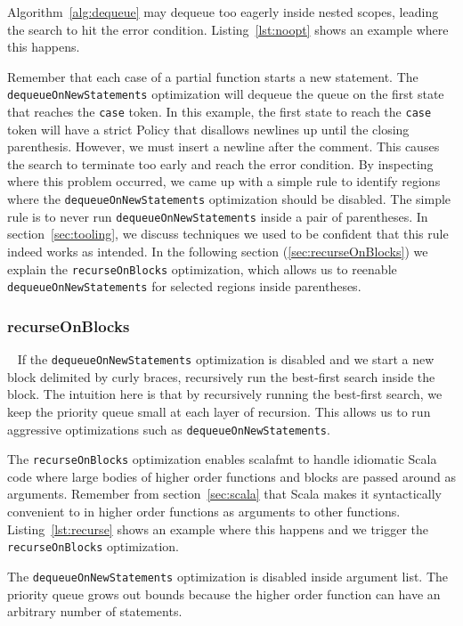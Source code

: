 Algorithm~\ref{alg:dequeue} may dequeue too eagerly inside nested scopes, leading the search to hit the error condition.
Listing~\ref{lst:noopt} shows an example where this happens.

Remember that each case of a partial function starts a new statement.
The \texttt{dequeueOnNewStatements} optimization will dequeue the queue on the first state that reaches the \texttt{case} token.
In this example, the first state to reach the \texttt{case} token will have a strict Policy that disallows newlines up until the closing parenthesis.
However, we must insert a newline after the comment.
This causes the search to terminate too early and reach the error condition.
By inspecting where this problem occurred, we came up with a simple rule to identify regions where the \texttt{dequeueOnNewStatements} optimization should be disabled.
The simple rule is to never run \texttt{dequeueOnNewStatements} inside a pair of parentheses.
In section~\ref{sec:tooling}, we discuss techniques we used to be confident that this rule indeed works as intended.
In the following section (\ref{sec:recurseOnBlocks}) we explain the \texttt{recurseOnBlocks} optimization, which allows us to reenable \texttt{dequeueOnNewStatements} for selected regions inside parentheses.

\subsubsection{recurseOnBlocks}~\label{sec:recurseOnBlocks}
If the \texttt{dequeueOnNewStatements} optimization is disabled and we start a new block delimited by curly braces, recursively run the best-first search inside the block.
The intuition here is that by recursively running the best-first search, we keep the priority queue small at each layer of recursion.
This allows us to run aggressive optimizations such as \texttt{dequeueOnNewStatements}.

The \texttt{recurseOnBlocks} optimization enables scalafmt to handle idiomatic Scala code where large bodies of higher order functions and blocks are passed around as arguments.
Remember from section~\ref{sec:scala} that  Scala makes it syntactically convenient to in higher order functions as arguments to other functions.
Listing~\ref{lst:recurse} shows an example where this happens and we trigger the \texttt{recurseOnBlocks} optimization.

The \texttt{dequeueOnNewStatements} optimization is disabled inside argument list.
The priority queue grows out bounds because the higher order function can have an arbitrary number of statements.

